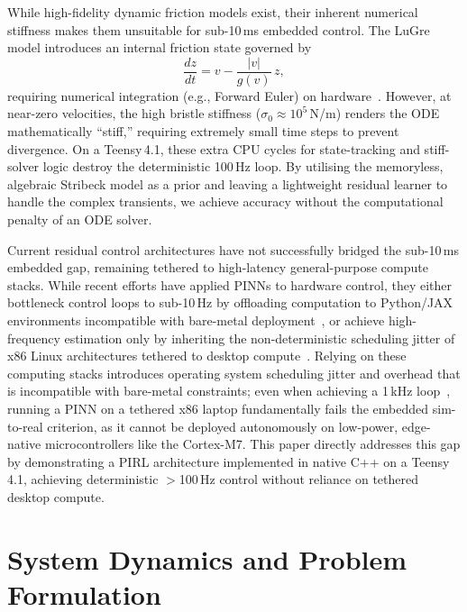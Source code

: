 \documentclass[11pt, a4paper]{article}
\begin{document}
While high-fidelity dynamic friction models exist, their inherent numerical
stiffness makes them unsuitable for sub-10\,ms embedded control.
The LuGre model introduces an internal friction state governed by
\begin{equation}
    \frac{dz}{dt} = v - \frac{\lvert v \rvert}{g(v)}\,z,
    \label{eq:lugre}
\end{equation}
requiring numerical integration (e.g., Forward Euler) on
hardware~\citep{376053}.
However, at near-zero velocities, the high bristle stiffness
($\sigma_0 \approx 10^5$\,N/m) renders the ODE mathematically ``stiff,''
requiring extremely small time steps to prevent divergence.
On a Teensy\,4.1, these extra CPU cycles for state-tracking and
stiff-solver logic destroy the deterministic 100\,Hz loop.
By utilising the memoryless, algebraic Stribeck model as a prior and
leaving a lightweight residual learner to handle the complex transients,
we achieve accuracy without the computational penalty of an ODE solver.

Current residual control architectures have not successfully bridged the
sub-10\,ms embedded gap, remaining tethered to high-latency
general-purpose compute stacks.
While recent efforts have applied PINNs to hardware control, they either
bottleneck control loops to sub-10\,Hz by offloading computation to
Python/JAX environments incompatible with bare-metal
deployment~\citep{liu2023physicsinformedneuralnetworksmodel}, or achieve
high-frequency estimation only by inheriting the non-deterministic
scheduling jitter of x86 Linux architectures tethered to desktop
compute~\citep{10971218}.
Relying on these computing stacks introduces operating system scheduling
jitter and overhead that is incompatible with bare-metal constraints; even
when achieving a 1\,kHz loop~\citep{10971218}, running a PINN on a
tethered x86 laptop fundamentally fails the embedded sim-to-real
criterion, as it cannot be deployed autonomously on low-power, edge-native
microcontrollers like the Cortex-M7.
This paper directly addresses this gap by demonstrating a PIRL architecture
implemented in native C++ on a Teensy\,4.1, achieving deterministic
$>$100\,Hz control without reliance on tethered desktop compute.

\section{System Dynamics and Problem Formulation}
\end{document}
